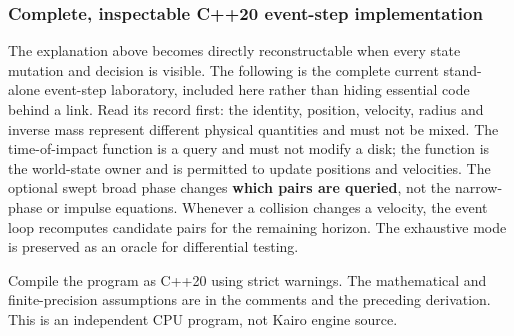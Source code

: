 \subsubsection{Complete, inspectable C++20 event-step implementation}\label{06-engine-ii-ch046-complete-inspectable-c20-event-step-implementation}

\hypertarget{06-engine-ii-ch046-complete-inspectable-c20-event-step-implementation}{}

The explanation above becomes directly reconstructable when every state mutation and decision is visible. The following is the complete current stand-alone event-step laboratory, included here rather than hiding essential code behind a link. Read its  record first: the identity, position, velocity, radius and inverse mass represent different physical quantities and must not be mixed. The time-of-impact function is a query and must not modify a disk; the  function is the world-state owner and is permitted to update positions and velocities. The optional swept broad phase changes \textbf{which pairs are queried}, not the narrow-phase or impulse equations. Whenever a collision changes a velocity, the event loop recomputes candidate pairs for the remaining horizon. The exhaustive mode is preserved as an oracle for differential testing.

Compile the program as C++20 using strict warnings. The mathematical and finite-precision assumptions are in the comments and the preceding derivation. This is an independent CPU program, not Kairo engine source.

